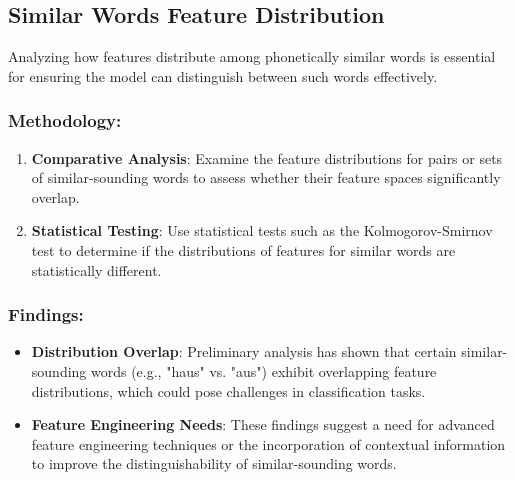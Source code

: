 \subsection{Similar Words Feature Distribution}

Analyzing how features distribute among phonetically similar words is essential for ensuring the model can distinguish between such words effectively.

\subsubsection{Methodology:}

\begin{enumerate}
    \item \textbf{Comparative Analysis}: Examine the feature distributions for pairs or sets of similar-sounding words to assess whether their feature spaces significantly overlap.
    \item \textbf{Statistical Testing}: Use statistical tests such as the Kolmogorov-Smirnov test to determine if the distributions of features for similar words are statistically different.
\end{enumerate}

\subsubsection{Findings:}

\begin{itemize}
    \item \textbf{Distribution Overlap}: Preliminary analysis has shown that certain similar-sounding words (e.g., "haus" vs. "aus") exhibit overlapping feature distributions, which could pose challenges in classification tasks.
    \item \textbf{Feature Engineering Needs}: These findings suggest a need for advanced feature engineering techniques or the incorporation of contextual information to improve the distinguishability of similar-sounding words.
\end{itemize}

